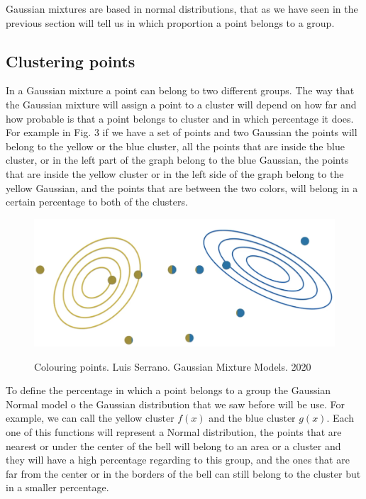\documentclass[conference]{IEEEtran}
\begin{document}
Gaussian mixtures are based in normal distributions, that as we have seen in the previous section will tell us in which proportion a point belongs to a group.

\subsection{Clustering points}

In a Gaussian mixture a point can belong to two different groups. The way that the Gaussian mixture will assign a point to a cluster will depend on how far and how probable is that a point belongs to cluster and in which percentage it does. For example in Fig. 3 if we have a set of points and two Gaussian the points will belong to the yellow or the blue cluster, all the points that are inside the blue cluster, or in the left part of the graph belong to the blue Gaussian, the points that are inside the yellow cluster or in the left side of the graph belong to the yellow Gaussian, and the points that are between the two colors, will belong in a certain percentage to both of the clusters.


\begin{figure}[h]
	\includegraphics[scale=0.19]{imgs/gaussian1.png}
	\label{fig:gaussian}
	\caption{Colouring points. Luis Serrano. Gaussian Mixture Models. 2020}
\end{figure}

To define the percentage in which a point belongs to a group the Gaussian Normal model o the Gaussian distribution that we saw before will be use. For example, we can call the yellow cluster $f(x)$ and the blue cluster $g(x)$. Each one of this functions will represent a Normal distribution, the points that are nearest or under the center of the bell will belong to an area or a cluster and they will have a high percentage regarding to this group, and the ones that are far from the center or in the borders of the bell can still belong to the cluster but in a smaller percentage. 
\end{document}
